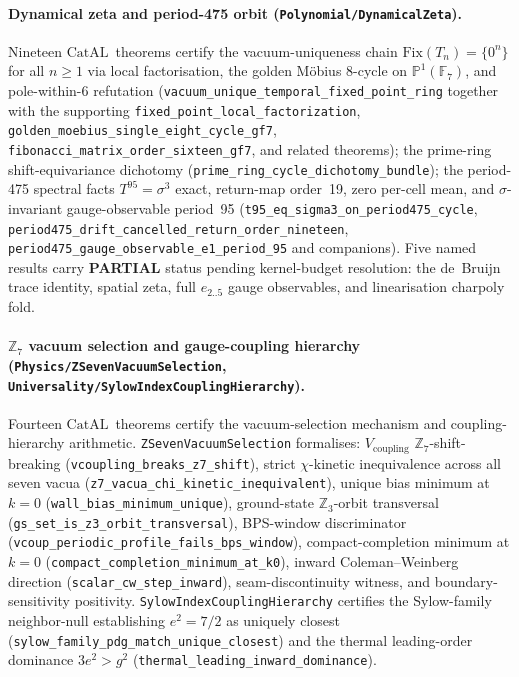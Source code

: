 \documentclass[11pt,a4paper]{article}
\theoremstyle{definition}
\newcommand{\CatAL}{\ensuremath{\mathrm{CatAL}}}
\begin{document}
\paragraph{Dynamical zeta and period-475 orbit
  (\texttt{Polynomial/\allowbreak DynamicalZeta}).}
Nineteen \CatAL\ theorems certify the vacuum-uniqueness chain
$\mathrm{Fix}(T_n)=\{0^n\}$ for all $n\ge 1$ via local factorisation, the
golden Möbius 8-cycle on $\mathbb{P}^1(\mathbb{F}_7)$, and pole-within-6
refutation (\texttt{vacuum\_unique\_temporal\_fixed\_point\_ring} together with
the supporting \texttt{fixed\_point\_local\_factorization},
\texttt{golden\_moebius\_single\_eight\_cycle\_gf7},
\texttt{fibonacci\_matrix\_order\_sixteen\_gf7}, and related theorems);
the prime-ring shift-equivariance dichotomy
(\texttt{prime\_ring\_cycle\_dichotomy\_bundle});
the period-475 spectral facts $T^{95}=\sigma^3$ exact, return-map order~19,
zero per-cell mean, and $\sigma$-invariant gauge-observable period~95
(\texttt{t95\_eq\_sigma3\_on\_period475\_cycle},
\texttt{period475\_drift\_cancelled\_return\_order\_nineteen},
\texttt{period475\_gauge\_observable\_e1\_period\_95} and companions).
Five named results carry \textbf{PARTIAL} status pending kernel-budget
resolution: the de~Bruijn trace identity, spatial zeta, full $e_{2..5}$ gauge
observables, and linearisation charpoly fold.

\paragraph{$\mathbb{Z}_7$ vacuum selection and gauge-coupling hierarchy
  (\texttt{Physics/\allowbreak ZSevenVacuumSelection},
  \texttt{Universality/\allowbreak SylowIndexCouplingHierarchy}).}
Fourteen \CatAL\ theorems certify the vacuum-selection mechanism and
coupling-hierarchy arithmetic.
\texttt{ZSevenVacuumSelection} formalises: $V_{\mathrm{coupling}}$
$\mathbb{Z}_7$-shift-breaking (\texttt{vcoupling\_breaks\_z7\_shift}),
strict $\chi$-kinetic inequivalence across all seven vacua
(\texttt{z7\_vacua\_chi\_kinetic\_inequivalent}),
unique bias minimum at $k{=}0$ (\texttt{wall\_bias\_minimum\_unique}),
ground-state $\mathbb{Z}_3$-orbit transversal
(\texttt{gs\_set\_is\_z3\_orbit\_transversal}),
BPS-window discriminator (\texttt{vcoup\_periodic\_profile\_fails\_bps\_window}),
compact-completion minimum at $k{=}0$
(\texttt{compact\_completion\_minimum\_at\_k0}),
inward Coleman--Weinberg direction (\texttt{scalar\_cw\_step\_inward}),
seam-discontinuity witness, and boundary-sensitivity positivity.
\texttt{SylowIndexCouplingHierarchy} certifies the Sylow-family
neighbor-null establishing $e^2=7/2$ as uniquely closest
(\texttt{sylow\_family\_pdg\_match\_unique\_closest}) and the thermal
leading-order dominance $3e^2>g^2$
(\texttt{thermal\_leading\_inward\_dominance}).
\end{document}
